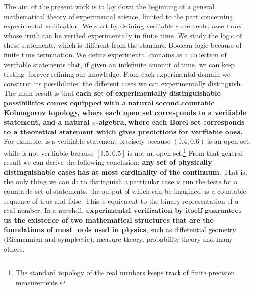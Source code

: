 \documentclass[twocolumn]{article}
\begin{document}
The aim of the present work is to lay down the beginning of a general mathematical theory of experimental science, limited to the part concerning experimental verification. We start by defining verifiable statements: assertions whose truth can be verified experimentally in finite time. We study the logic of these statements, which is different from the standard Boolean logic because of finite time termination. We define experimental domains as a collection of verifiable statements that, if given an indefinite amount of time, we can keep testing, forever refining our knowledge. From each experimental domain we construct its possibilities: the different cases we can experimentally distinguish. The main result is that \textbf{each set of experimentally distinguishable possibilities comes equipped with a natural second-countable Kolmogorov topology, where each open set corresponds to a verifiable statement, and a natural $\sigma$-algebra, where each Borel set corresponds to a theoretical statement which gives predictions for verifiable ones.} For example,  is a verifiable statement precisely because $(0.4, 0.6)$ is an open set, while  is not verifiable because $[0.5,0.5]$ is not an open set.\footnote{The standard topology of the real numbers keeps track of finite precision measurements.} From that general result we can derive the following conclusion: \textbf{any set of physically distinguishable cases has at most cardinality of the continuum}. That is, the only thing we can do to distinguish a particular case is run the tests for a countable set of statements, the output of which can be imagined as a countable sequence of true and false. This is equivalent to the binary representation of a real number. In a nutshell, \textbf{experimental verification by itself guarantees us the existence of two mathematical structures that are the foundations of most tools used in physics}, such as differential geometry (Riemannian and symplectic), measure theory, probability theory and many others.

\end{document}

